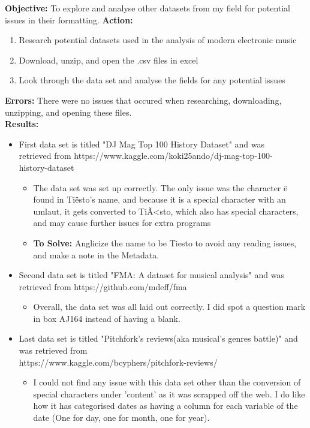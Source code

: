 \documentclass{article}
\begin{document}
\vspace{5mm}
\newline
\textbf{Objective:} To explore and analyse other datasets from my field for potential issues in their formatting. 
\newline
\textbf{Action:}
\begin{enumerate}
    \item Research potential datasets used in the analysis of modern electronic music
    \item Download, unzip, and open the .csv files in excel
    \item Look through the data set and analyse the fields for any potential issues
\end{enumerate}
\textbf{Errors:} There were no issues that occured when researching, downloading, unzipping, and opening these files. \\
\textbf{Results:}
\begin{itemize}
    \item First data set is titled "DJ Mag Top 100 History Dataset" and was \\ retrieved from https://www.kaggle.com/koki25ando/dj-mag-top-100-\\history-dataset
    \begin{itemize}
        \item  The data set was set up correctly. The only issue was the character ë found in Tiësto's name, and because it is a special character with an umlaut, it gets converted to TiÃ<sto, which also has special characters, and may cause further issues for extra programs
        \item \textbf{To Solve:} Anglicize the name to be Tiesto to avoid any reading issues, and make a note in the Metadata.
    \end{itemize}
    \item Second data set is titled "FMA: A dataset for musical analysis" and was retrieved from https://github.com/mdeff/fma
    \begin{itemize}
        \item Overall, the data set was all laid out correctly. I did spot a question mark in box AJ164 instead of having a blank.
    \end{itemize}
    \item Last data set is titled "Pitchfork's reviews(aka musical's genres battle)" and was retrieved from \\https://www.kaggle.com/bcyphers/pitchfork-reviews/
    \begin{itemize}
        \item I could not find any issue with this data set other than the conversion of special characters under 'content' as it was scrapped off the web. I do like how it has categorised dates as having a column for each variable of the date (One for day, one for month, one for year).
    \end{itemize}
\end{itemize}
\end{document}
